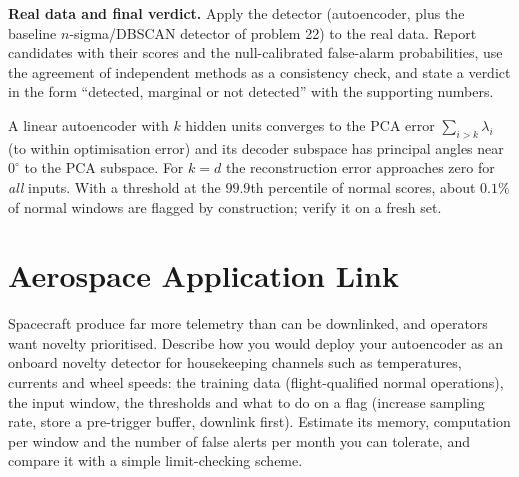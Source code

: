 \documentclass[11pt,a4paper]{article}
\begin{document}
\begin{tasks}
  \item \textbf{Real data and final verdict.} Apply the detector (autoencoder, plus the baseline $n$-sigma/DBSCAN detector of problem 22) to the real data. Report candidates with their scores and the null-calibrated false-alarm probabilities, use the agreement of independent methods as a consistency check, and state a verdict in the form ``detected, marginal or not detected'' with the supporting numbers.
\end{tasks}

\begin{checkpoint}
A linear autoencoder with $k$ hidden units converges to the PCA error $\sum_{i>k}\lambda_i$ (to within optimisation error) and its decoder subspace has principal angles near $0^\circ$ to the PCA subspace. For $k=d$ the reconstruction error approaches zero for \emph{all} inputs. With a threshold at the $99.9$th percentile of normal scores, about $0.1\%$ of normal windows are flagged by construction; verify it on a fresh set.
\end{checkpoint}

\section*{Aerospace Application Link}
Spacecraft produce far more telemetry than can be downlinked, and operators want novelty prioritised. Describe how you would deploy your autoencoder as an onboard novelty detector for housekeeping channels such as temperatures, currents and wheel speeds: the training data (flight-qualified normal operations), the input window, the thresholds and what to do on a flag (increase sampling rate, store a pre-trigger buffer, downlink first). Estimate its memory, computation per window and the number of false alerts per month you can tolerate, and compare it with a simple limit-checking scheme.
\end{document}
